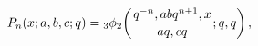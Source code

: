 \[\mathop{P_{n}\/}\nolimits\!\left(x;a,b,c;q\right)=\mathop{{{}_{3}\phi_{2}}\/}%
\nolimits\!\left({q^{-n},abq^{n+1},x\atop aq,cq};q,q\right),\]